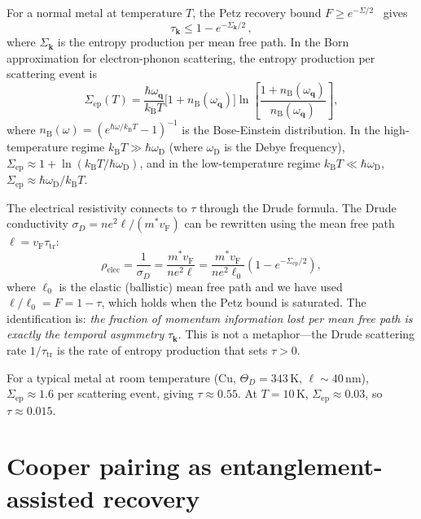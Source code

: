 \documentclass[prb,twocolumn,superscriptaddress,longbibliography,floatfix]{revtex4-2}
\newcommand{\kB}{k_{\mathrm{B}}}
\newcommand{\tauasym}{\tau}
\newcommand{\oD}{\omega_{\mathrm{D}}}
\newcommand{\vF}{v_{\mathrm{F}}}
\begin{document}
For a normal metal at temperature $T$, the Petz recovery bound
$F \geq e^{-\Sigma/2}$~\cite{Junge2018,Fawzi2015} gives
\begin{equation}\label{eq:tau_bound}
  \tauasym_{\bm{k}} \leq 1 - e^{-\Sigma_{\bm{k}}/2}\,,
\end{equation}
where $\Sigma_{\bm{k}}$ is the entropy production per mean free path.
In the Born approximation for electron-phonon scattering, the
entropy production per scattering event is~\cite{Ziman1960}
\begin{equation}\label{eq:sigma_ep}
  \Sigma_{\mathrm{ep}}(T) = \frac{\hbar\omega_{\bm{q}}}{\kB T}
  \bigl[1 + n_{\mathrm{B}}(\omega_{\bm{q}})\bigr]
  \ln\!\left[\frac{1+n_{\mathrm{B}}(\omega_{\bm{q}})}
  {n_{\mathrm{B}}(\omega_{\bm{q}})}\right],
\end{equation}
where $n_{\mathrm{B}}(\omega) = (e^{\hbar\omega/\kB T} - 1)^{-1}$
is the Bose-Einstein distribution.  In the high-temperature regime
$\kB T \gg \hbar\oD$ (where $\oD$ is the Debye frequency),
$\Sigma_{\mathrm{ep}} \approx 1 + \ln(\kB T/\hbar\oD)$, and
in the low-temperature regime $\kB T \ll \hbar\oD$,
$\Sigma_{\mathrm{ep}} \approx \hbar\oD/\kB T$.

The electrical resistivity connects to $\tauasym$ through the Drude
formula.  The Drude conductivity
$\sigma_D = n e^2 \ell / (m^* \vF)$ can be rewritten using the
mean free path $\ell = \vF \tau_{\mathrm{tr}}$:
\begin{equation}\label{eq:drude_tau}
  \rho_{\mathrm{elec}} = \frac{1}{\sigma_D}
  = \frac{m^* \vF}{n e^2 \ell}
  = \frac{m^* \vF}{n e^2 \ell_0}
  \left(1 - e^{-\Sigma_{\mathrm{ep}}/2}\right),
\end{equation}
where $\ell_0$ is the elastic (ballistic) mean free path and
we have used $\ell/\ell_0 = F = 1 - \tauasym$, which holds
when the Petz bound is saturated.  The identification is:
\emph{the fraction of momentum information lost per mean free path
is exactly the temporal asymmetry} $\tauasym_{\bm{k}}$.  This
is not a metaphor---the Drude scattering rate $1/\tau_{\mathrm{tr}}$
is the rate of entropy production that sets $\tauasym > 0$.

For a typical metal at room temperature (Cu, $\Theta_D = 343\,$K,
$\ell \sim 40\,$nm),
$\Sigma_{\mathrm{ep}} \approx 1.6$ per scattering event, giving
$\tauasym \approx 0.55$.  At $T = 10\,$K,
$\Sigma_{\mathrm{ep}} \approx 0.03$, so $\tauasym \approx 0.015$.

\section{Cooper pairing as entanglement-assisted recovery}
\label{sec:cooper}
\end{document}
